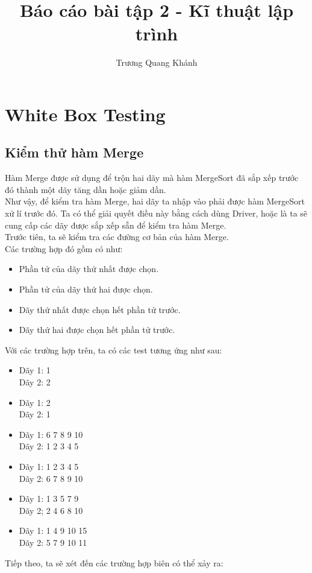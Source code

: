 \documentclass{report}
\author{Trương Quang Khánh}
\title{Báo cáo bài tập 2 - Kĩ thuật lập trình}
\begin{document}
    \maketitle
    \section{White Box Testing}
    \subsection{Kiểm thử hàm Merge}
    Hàm Merge được sử dụng để trộn hai dãy mà hàm MergeSort đã 
    sắp xếp trước đó thành một dãy tăng dần hoặc giảm dần. \\
    Như vậy, để kiểm tra hàm Merge, hai dãy ta nhập vào phải được hàm
    MergeSort xử lí trước đó. Ta có thể giải quyết điều này bằng cách dùng
    Driver, hoặc là ta sẽ cung cấp các dãy được sắp xếp sẵn để kiểm tra hàm
    Merge. \\ 
    Trước tiên, ta sẽ kiểm tra các đường cơ bản của hàm Merge. \\
    Các trường hợp đó gồm có như:
    \begin{itemize}
        \item Phần tử của dãy thứ nhất được chọn.
        \item Phần tử của dãy thứ hai được chọn.
        \item Dãy thứ nhất được chọn hết phần tử trước.
        \item Dãy thứ hai được chọn hết phần tử trước.
    \end{itemize}
    Với các trường hợp trên, ta có các test tương ứng như sau:
    \begin{itemize}
        \item Dãy 1: 1 \\ Dãy 2: 2
        \item Dãy 1: 2 \\ Dãy 2: 1
        \item Dãy 1: 6 7 8 9 10 \\ Dãy 2: 1 2 3 4 5
        \item Dãy 1: 1 2 3 4 5  \\ Dãy 2: 6 7 8 9 10
        \item Dãy 1: 1 3 5 7 9  \\ Dãy 2; 2 4 6 8 10
        \item Dãy 1: 1 4 9 10 15  \\ Dãy 2: 5 7 9 10 11
    \end{itemize}
    Tiếp theo, ta sẽ xét đến các trường hợp biên có thể xảy ra:
\end{document}
